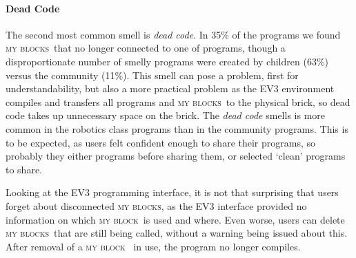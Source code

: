\documentclass[conference]{IEEEtran}
\newcommand{\mbs}{\textsc{my blocks}}
\newcommand{\mb}{\textsc{my block}}
\begin{document}
\paragraph{Dead Code}
The second most common smell is \emph{dead code}. In 35\% of the programs we found \mbs~that no longer connected to one of programs, though a disproportionate number of smelly programs were created by children (63\%) versus the community (11\%). This smell can pose a problem, first for understandability, but also  a more practical problem as the EV3 environment compiles and transfers all programs and \mbs~to the physical brick, so dead code takes up unnecessary space on the brick. The \emph{dead code} smells is more common in the robotics class programs than in the community programs. This is to be expected, as users felt confident enough to share their programs, so probably they either programs before sharing them, or selected `clean' programs to share.

Looking at the EV3 programming interface, it is not that surprising that users forget about disconnected \mbs, as the EV3 interface provided no information on which \mb~is used and where. Even worse, users can delete \mbs~that are still being called, without a warning being issued about this. After removal of a \mb~ in use, the program no longer compiles.


%
%
%
\end{document}
